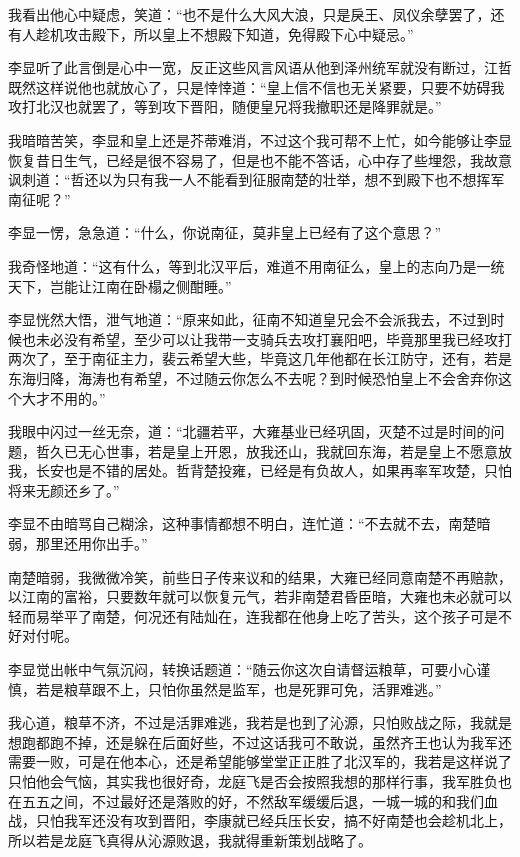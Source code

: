我看出他心中疑虑，笑道：“也不是什么大风大浪，只是戾王、凤仪余孽罢了，还有人趁机攻击殿下，所以皇上不想殿下知道，免得殿下心中疑忌。”

李显听了此言倒是心中一宽，反正这些风言风语从他到泽州统军就没有断过，江哲既然这样说他也就放心了，只是悻悻道：“皇上信不信也无关紧要，只要不妨碍我攻打北汉也就罢了，等到攻下晋阳，随便皇兄将我撤职还是降罪就是。”

我暗暗苦笑，李显和皇上还是芥蒂难消，不过这个我可帮不上忙，如今能够让李显恢复昔日生气，已经是很不容易了，但是也不能不答话，心中存了些埋怨，我故意讽刺道：“哲还以为只有我一人不能看到征服南楚的壮举，想不到殿下也不想挥军南征呢？”

李显一愣，急急道：“什么，你说南征，莫非皇上已经有了这个意思？”

我奇怪地道：“这有什么，等到北汉平后，难道不用南征么，皇上的志向乃是一统天下，岂能让江南在卧榻之侧酣睡。”

李显恍然大悟，泄气地道：“原来如此，征南不知道皇兄会不会派我去，不过到时候也未必没有希望，至少可以让我带一支骑兵去攻打襄阳吧，毕竟那里我已经攻打两次了，至于南征主力，裴云希望大些，毕竟这几年他都在长江防守，还有，若是东海归降，海涛也有希望，不过随云你怎么不去呢？到时候恐怕皇上不会舍弃你这个大才不用的。”

我眼中闪过一丝无奈，道：“北疆若平，大雍基业已经巩固，灭楚不过是时间的问题，哲久已无心世事，若是皇上开恩，放我还山，我就回东海，若是皇上不愿意放我，长安也是不错的居处。哲背楚投雍，已经是有负故人，如果再率军攻楚，只怕将来无颜还乡了。”

李显不由暗骂自己糊涂，这种事情都想不明白，连忙道：“不去就不去，南楚暗弱，那里还用你出手。”

南楚暗弱，我微微冷笑，前些日子传来议和的结果，大雍已经同意南楚不再赔款，以江南的富裕，只要数年就可以恢复元气，若非南楚君昏臣暗，大雍也未必就可以轻而易举平了南楚，何况还有陆灿在，连我都在他身上吃了苦头，这个孩子可是不好对付呢。

李显觉出帐中气氛沉闷，转换话题道：“随云你这次自请督运粮草，可要小心谨慎，若是粮草跟不上，只怕你虽然是监军，也是死罪可免，活罪难逃。”

我心道，粮草不济，不过是活罪难逃，我若是也到了沁源，只怕败战之际，我就是想跑都跑不掉，还是躲在后面好些，不过这话我可不敢说，虽然齐王也认为我军还需要一败，可是在他本心，还是希望能够堂堂正正胜了北汉军的，我若是这样说了只怕他会气恼，其实我也很好奇，龙庭飞是否会按照我想的那样行事，我军胜负也在五五之间，不过最好还是落败的好，不然敌军缓缓后退，一城一城的和我们血战，只怕我军还没有攻到晋阳，李康就已经兵压长安，搞不好南楚也会趁机北上，所以若是龙庭飞真得从沁源败退，我就得重新策划战略了。


